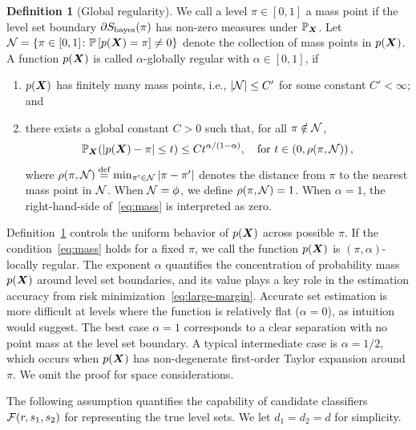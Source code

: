 \documentclass[11pt]{article}
\theoremstyle{definition}
\newtheorem{defn}{Definition}
\def\bayesS{S_{\textup{bayes}}}
\begin{document}
\begin{defn} [Global regularity]\label{ass:decboundary}We call a level $\pi\in[0,1]$ a mass point if the level set boundary $\partial \bayesS(\pi)$ has non-zero measures under $\mathbb{P}_{\bm X}$. Let $\mathcal{N}=\{\pi\in[0,1] \colon \mathbb{P}\left[p(\bm X)=\pi\right]\neq 0\}$ denote the collection of mass points in $p(\bm X)$. A function $p(\bm X)$ is called $\alpha$-globally regular with $\alpha\in[0,1]$, if 
\begin{enumerate}[label=(\roman*),wide, labelwidth=!, labelindent=0pt,topsep=-5pt,itemsep=-1ex,partopsep=0ex,parsep=1ex]
\item $p(\bm X)$ has finitely many mass points, i.e., $|\mathcal{N}|\leq C'$ for some constant $C'<\infty$; and 
\item 
there exists a global constant $C>0$ such that, for all $\pi \notin \mathcal{N} $,
\begin{equation}\label{eq:mass}
\mathbb{P}_{\bm X}(|p(\bm X)-\pi|\leq t)\leq Ct^{\alpha/(1-\alpha)}, \quad \text{for }t\in \left(0,\rho(\pi,\mathcal{N})\right),
\end{equation}
where $\rho(\pi,\mathcal{N})\stackrel{\text{def}}{=}\min_{\pi'\in \mathcal{N}} |\pi-\pi'|$  denotes the distance from $\pi$ to the nearest mass point in $\mathcal{N}$. When $\mathcal{N} = \phi$, we define $\rho(\pi,\mathcal{N})=1$. When $\alpha=1$, the right-hand-side of~\eqref{eq:mass} is interpreted as zero.
\end{enumerate}
\end{defn}

Definition~\ref{ass:decboundary} controls the uniform behavior of $p(\bm X)$ across possible $\pi$. If the condition~\eqref{eq:mass} holds for a fixed $\pi$, we call the function $p(\bm X)$ is $(\pi,\alpha)$-locally regular. The exponent $\alpha$ quantifies the concentration of probability mass $p(\bm X)$ around level set boundaries, and its value plays a key role in the estimation accuracy from risk minimization~\eqref{eq:large-margin}. Accurate set estimation is more difficult at levels where the function is relatively flat ($\alpha = 0$), as intuition would suggest. The best case $\alpha=1$ corresponds to a clear separation with no point mass at the level set boundary. A typical intermediate case is $\alpha=1/2$, which occurs when $p(\bm X)$ has non-degenerate first-order Taylor expansion around $\pi$. We omit the proof for space considerations.

The following assumption quantifies the capability of candidate classifiers $\mathcal{F}(r,s_1,s_2)$ for representing the true level sets. We let $d_1=d_2=d$ for simplicity. 
\end{document}
